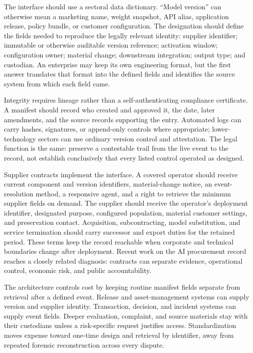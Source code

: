 The interface should use a sectoral data dictionary. ``Model version'' can otherwise mean a marketing name, weight snapshot, API alias, application release, policy bundle, or customer configuration. The designation should define the fields needed to reproduce the legally relevant identity: supplier identifier; immutable or otherwise auditable version reference; activation window; configuration owner; material change; downstream integration; output type; and custodian. An enterprise may keep its own engineering format, but the first answer translates that format into the defined fields and identifies the source system from which each field came.

Integrity requires lineage rather than a self-authenticating compliance certificate. A manifest should record who created and approved it, the date, later amendments, and the source records supporting the entry. Automated logs can carry hashes, signatures, or append-only controls where appropriate; lower-technology sectors can use ordinary version control and attestation. The legal function is the same: preserve a contestable trail from the live event to the record, not establish conclusively that every listed control operated as designed.

Supplier contracts implement the interface. A covered operator should receive current component and version identifiers, material-change notice, an event-resolution method, a responsive agent, and a right to retrieve the minimum supplier fields on demand. The supplier should receive the operator's deployment identifier, designated purpose, configured population, material customer settings, and preservation contact. Acquisition, subcontracting, model substitution, and service termination should carry successor and export duties for the retained period. These terms keep the record reachable when corporate and technical boundaries change after deployment. Recent work on the AI procurement record reaches a closely related diagnosis: contracts can separate evidence, operational control, economic risk, and public accountability.

The architecture controls cost by keeping routine manifest fields separate from retrieval after a defined event. Release and asset-management systems can supply version and supplier identity. Transaction, decision, and incident systems can supply event fields. Deeper evaluation, complaint, and source materials stay with their custodians unless a risk-specific request justifies access. Standardization moves expense toward one-time design and retrieval by identifier, away from repeated forensic reconstruction across every dispute.

